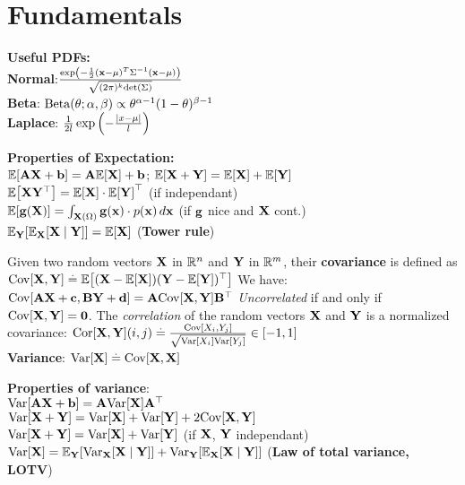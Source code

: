 \section{Fundamentals}
\begin{framed}
    \textbf{Useful PDFs:} \\
    \textbf{Normal}:$\frac{\exp \left(-\frac{1}{2}(\mathbf{x} - \mathbf{\mu})^T \Sigma^{-1} (\mathbf{x} - \mathbf{\mu}) \right)}{\sqrt{(2\pi)^k \mathrm{det}\left(\Sigma\right)}}$ \\
    \textbf{Beta}: $\Beta[\theta]{\alpha}{\beta} \propto \theta^{\alpha-1} (1-\theta)^{\beta-1}$ \\
    \textbf{Laplace}: $\frac{1}{2l}\exp\left(-\frac{\left| x - \mu \right|}{l}\right)$
\end{framed}
\begin{framed}
    \textbf{Properties of Expectation:}\\
    $\E{\mA \rX + \vb} = \mA \E{\rX} + \vb $; $ \E{\rX + \rY} = \E{\rX} + \E{\rY}$ \\
    $\E{\rX\transpose{\rY}} = \E{\rX} \cdot \transpose{\E{\rY}}$ (if independant)\\
    $\E{\vg(\rX)} = \int_{\rX(\Omega)} \vg(\vx) \cdot p(\vx) \,d\vx$ (if $\mathbf{g}$ nice and $\mathbf{X}$ cont.) \\
    $\E[\rY]{\E[\rX]{\rX \mid \rY}} = \E{\rX}$ (\textbf{Tower rule})
\end{framed} 
Given two random vectors $\mathbf{X}$ in $\mathbb{R}^n$ and $\mathbf{Y}$ in $\mathbb{R}^m$, their \textbf{covariance} is defined as
  $\Cov{\rX, \rY} \defeq \E{(\rX - \E{\rX})\transpose{(\rY - \E{\rY})}}$
We have: $\Cov{\mA\rX + \vc, \mB\rY + \vd} = \mA\Cov{\rX,\rY}\transpose{\mB}$
\emph{Uncorrelated} if and only if $\Cov{\rX, \rY} = \mzero$.
The \emph{correlation} of the random vectors $\mathbf{X}$ and $\mathbf{Y}$ is a normalized covariance: $\Cor{\rX,\rY}(i,j) \defeq \frac{\Cov{X_i,Y_j}}{\sqrt{\Var{X_i} \Var{Y_j}}} \in [-1,1]$\\
\textbf{Variance}: $\Var{\rX} \defeq \Cov{\rX, \rX}$ \\
\begin{framed}
\textbf{Properties of variance}:\\
$\Var{\mA\rX + \vb} = \mA\Var{\rX}\transpose{\mA}$\\
$\Var{\rX + \rY} = \Var{\rX} + \Var{\rY} + 2 \Cov{\rX, \rY}$\\
$\Var{\rX + \rY} = \Var{\rX} + \Var{\rY}$ (if $\mathbf{X}$, $\mathbf{Y}$ independant)
$\Var{\rX} = \E[\rY]{\Var[\rX]{\rX \mid \rY}} + \Var[\rY]{\E[\rX]{\rX \mid \rY}}$ (\textbf{Law of total variance, LOTV})
\end{framed}
